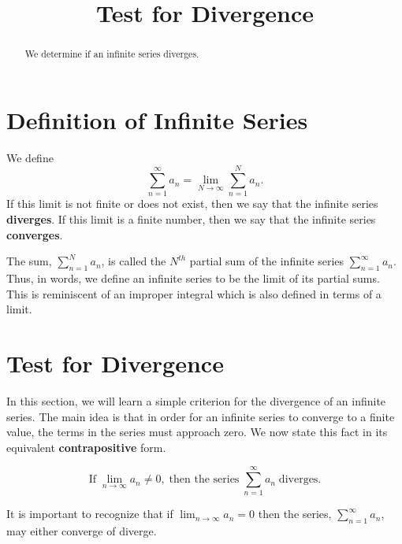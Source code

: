 \documentclass{ximera}
\title{Test for Divergence}
\begin{document}
\begin{abstract}
We determine if an infinite series diverges.
\end{abstract}

\maketitle

\section{Definition of Infinite Series}

\begin{definition}
We define
\[\sum_{n=1}^\infty a_n = \lim_{N \to \infty} \sum_{n=1}^N a_n.\]
If this limit is not finite or does not exist, then we say that the infinite series \textbf{diverges}.
If this limit is a finite number, then we say that the infinite series \textbf{converges}.
\end{definition}

\begin{remark}
The sum, $\displaystyle{\sum_{n=1}^N a_n}$, is called the $N^{th}$ partial sum of the infinite series
$\displaystyle{\sum_{n=1}^\infty a_n}$. Thus, in words, we define an infinite series to be the limit of its partial sums.
This is reminiscent of an improper integral which is also defined in terms of a limit.
\end{remark}

\section{Test for Divergence}

In this section, we will learn a simple criterion for the divergence of an infinite series.
The main idea is that in order for an infinite series to converge to a finite value, the terms in the series
must approach zero. We now state this fact in its equivalent \textbf{contrapositive} form.


\begin{theorem}


\[
\text{If}  \; \lim_{n\to \infty} a_n \neq 0,
\; \text{then the series} \;
\sum_{n=1}^\infty a_n \;
\text{diverges.}
\]

\end{theorem}

\begin{remark}
It is important to recognize that if $\displaystyle{\lim_{n \to \infty} a_n = 0}$ then the series, $\displaystyle{\sum_{n=1}^\infty a_n}$, may either converge of diverge.
\end{remark}
\end{document}

